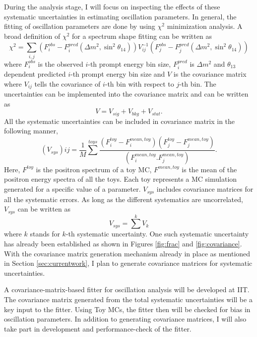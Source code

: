 \documentclass[11pt]{article}
\numberwithin{equation}{section}
\begin{document}
During the analysis stage, I will focus on inspecting the effects of these systematic uncertainties in estimating oscillation parameters. In general, the fitting of oscillation parameters are done by using $\chi ^{2}$ minimization analysis. A broad definition of $\chi^{2}$  for a spectrum shape fitting can be written as
\begin{equation}
\label{eq:covariance}
\chi ^{2} = \sum\limits_{i,j} (F^{obs}_{i}-F^{pred}_{i}(\Delta m^{2}, \sin ^{2} \theta_{14})) V^{-1}_{ij}(F^{obs}_{j}-F^{pred}_{j}(\Delta m^{2}, \sin ^{2} \theta_{14}))
\end{equation}
where $F^{obs}_{i}$ is the observed $i$-th prompt energy bin size, $F^{pred}_{i}$ is $\Delta m^{2}$ and $\theta_{13}$ dependent predicted $i$-th prompt energy bin size and $V$ is the covariance matrix where $V_{ij}$ tells the covariance of $i$-th bin with respect to $j$-th bin. The uncertainties can be implemented into the covariance matrix and can be written as 
\begin{equation}
V=V_{sig}+V_{bkg}+V_{stat}.
\end{equation}
All the systematic uncertainties can be included in covariance matrix in the following manner,
\begin{equation}
(V_{sys}){ij}= \frac{1}{M} \sum\limits^{toys}\frac{(F^{toy}_{i} - F^{mean,toy}_{i})(F^{toy}_{j} - F^{mean,toy}_{j})}{(F^{mean,toy}_{i}. F^{mean,toy}_{j})}.
\end{equation}
Here, $F^{toy}$ is the positron spectrum of a toy MC, $F^{mean,toy}$ is the mean of the positron energy spectra of all the toys. Each toy represents a MC simulation generated for a specific value of a parameter.  $V_{sys}$ includes covariance matrices for all the systematic errors.  As long as the different systematics are uncorrelated, $V_{sys}$ can be written as 
\begin{equation}
V_{sys}=\sum\limits^{k} V_{k}
\end{equation}
where $k$ stands for $k$-th systematic uncertainty. One such systematic uncertainty has already been established as shown in Figures \ref{fig:frac} and \ref{fig:covariance}. With the covariance matrix generation mechanism already in place as mentioned in Section \ref{sec:currentwork}, I plan to generate covariance matrices for systematic uncertainties.

A covariance-matrix-based fitter for oscillation analysis will be developed at IIT. The covariance matrix generated from the total systematic uncertainties will be a key input to the fitter. Using Toy MCs, the fitter then will be checked for bias in oscillation parameters. In addition to generating covariance matrices, I will also take part in development and performance-check of the fitter.
\end{document}
